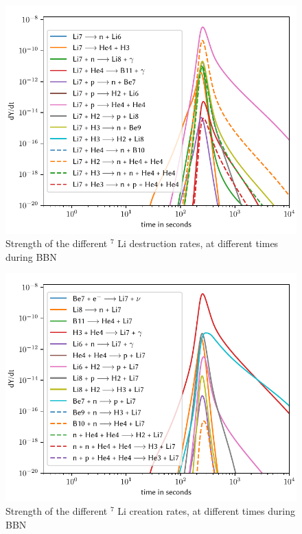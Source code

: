 \begin{figure}[ht]
    \includegraphics[width=5.1in]{figures/app/Li7destruct.pdf}
    \caption{Strength of the different ${}^7$ Li destruction rates, at different times during BBN}
    \label{fig:Li7destruct}
\end{figure}

\begin{figure}[ht]
    \includegraphics[width=5.1in]{figures/app/Li7create.pdf}
    \caption{Strength of the different ${}^7$ Li creation rates, at different times during BBN}
    \label{fig:Li7create}
\end{figure}